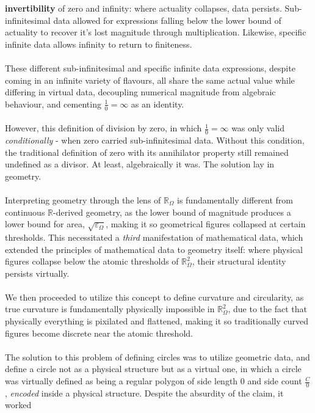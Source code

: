 \documentclass{article}
\begin{document}
\textbf{invertibility} of zero and infinity: where actuality collapses, 
data persists. Sub-infinitesimal data allowed for expressions falling below the lower bound of actuality to recover it's lost magnitude through multiplication. Likewise, specific infinite 
data allows infinity to return to finiteness. 
\\\\These different sub-infinitesimal and specific infinite data expressions, 
despite coming in an infinite variety of flavours, all share the same actual 
value while differing in virtual data, decoupling numerical magnitude from 
algebraic behaviour, and cementing $\frac{1}{0} = \infty$ as an identity.
\\\\However, this definition of division by zero, in which $\frac{1}{0} = \infty$ was only valid \textit{conditionally} - when zero carried sub-infinitesimal data. Without this condition, the traditional definition of zero with 
its annihilator property still remained undefined as a divisor. At least, algebraically 
it was. The solution lay in geometry.
\\\\Interpreting geometry through the lens of $\mathbb{R}_\Omega$ is fundamentally 
different from continuous $\mathbb{R}$-derived geometry, as the lower bound of 
magnitude produces a lower bound for area, $\sqrt{\varepsilon_\Omega}$, making it so geometrical figures collapsed at certain thresholds. This necessitated a \textit{third} manifestation of mathematical data, which extended the principles of mathematical data to geometry itself: where physical figures collapse below the atomic 
thresholds of $\mathbb{R}_\Omega^2$, their structural identity persists 
virtually.
\\\\We then proceeded to utilize this concept to define curvature and circularity, as true curvature is fundamentally physically impossible in $\mathbb{R}_\Omega^2$, due to the fact that physically everything is pixilated and flattened, making it so traditionally curved figures become discrete near the atomic threshold. 
\\\\The solution to this problem of defining circles was to utilize geometric data, and define a circle not as a physical structure but as a virtual one, in which a circle was virtually defined as being a regular polygon of side length 
$0$ and side count $\frac{C}{0}$, \textit{encoded} inside a physical structure. Despite the absurdity of the claim, it worked 
\end{document}
